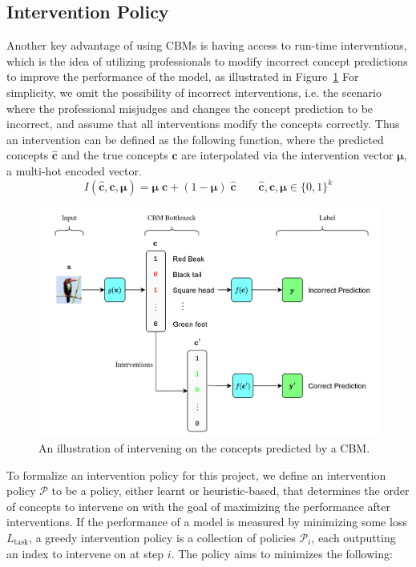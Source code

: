 \documentclass[../main.tex]{subfiles}
\begin{document}
\subsection{Intervention Policy}

Another key advantage of using CBMs is having access to 
run-time interventions, which is the idea of utilizing professionals
to modify incorrect concept predictions to improve the 
performance of the model, as illustrated in Figure~\ref{fig:cbm-interventions} For simplicity, we omit the
possibility of incorrect interventions, i.e. the scenario
where the professional misjudges and changes the concept prediction to be incorrect,
and assume that
all interventions modify the concepts correctly. Thus an intervention
can be defined as the following function, where
the predicted concepts $\hat{\mathbf{c}}$ and the true concepts $\mathbf{c}$ are interpolated
via the intervention vector $\bm{\mu}$, a multi-hot encoded vector.
\[I(\hat{\mathbf{c}}, \mathbf{c}, \bm{\mu}) = 
\bm{\mu} \; \mathbf{c} + (1 - \bm{\mu}) \; \hat{\mathbf{c}} \qquad \hat{\mathbf{c}}, \mathbf{c}, \bm{\mu} \in \{0, 1\}^k\]

\begin{figure}[!h]
    \centering
    \includegraphics[width=\textwidth]{figs/background/cbm_interventions.png}
    \caption{An illustration of intervening on the concepts predicted by a CBM.}
    \label{fig:cbm-interventions}
\end{figure}

To formalize an intervention policy for this
project, we define an intervention policy $\mathcal{P}$ to be a policy, either learnt
or heuristic-based, that determines the order of concepts to intervene 
on with the goal of maximizing the performance after interventions.
If the performance of a model is measured by minimizing some loss $L_{\text{task}}$,
a greedy intervention policy is a collection of policies $\mathcal{P}_i$, each
outputting an index to intervene on at step $i$. The policy aims to minimizes 
the following:
\end{document}
